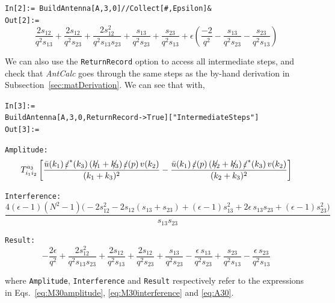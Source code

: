 \begin{mdframed}[backgroundcolor=gray!10, linewidth=0pt]
\texttt{In[2]:= BuildAntenna[A,3,0]//Collect[\#,Epsilon]\&}\\
\hfill
\texttt{Out[2]:=}
    \begin{equation*}
        \frac{2s_{12}}{q^2 s_{13}} + \frac{2s_{12}}{q^2 s_{23}} + \frac{2s_{12}^2}{q^2 s_{13}s_{23}} + \frac{s_{13}}{q^2 s_{23}} + \frac{s_{23}}{q^2 s_{13}} + \epsilon\left(\frac{-2}{q^2} - \frac{s_{13}}{q^2 s_{23}} - \frac{s_{23}}{q^2 s_{13}}\right)
    \end{equation*}
\end{mdframed}

We can also use the \texttt{ReturnRecord} option to access all intermediate steps, and check that 
\textit{AntCalc} goes through the same steps as the by-hand derivation in
Subsection~\ref{sec:matDerivation}. We can see that with,

\begin{mdframed}[backgroundcolor=gray!10, linewidth=0pt]
    \texttt{In[3]:= \\BuildAntenna[A,3,0,ReturnRecord->True]["IntermediateSteps"]}\\
    \texttt{Out[3]:=}

    \texttt{Amplitude:}
    \begin{equation*}
        T^{a_3}_{i_1 i_2}\left[
        \frac{\bar{u}(k_1)\,\slashed{\varepsilon}^*(k_3)\,(\slashed{k_1}+\slashed{k_3})\,\slashed{\varepsilon}(p)\,v(k_2)}{(k_1+k_3)^2}
        -
        \frac{\bar{u}(k_1)\,\slashed{\varepsilon}(p)\,(\slashed{k_2}+\slashed{k_3})\,\slashed{\varepsilon}^*(k_3)\,v(k_2)}{(k_2+k_3)^2}
        \right]
    \end{equation*}

    \texttt{Interference:}
    \begin{equation*}
        \frac{4(\epsilon-1)(N^2-1)\Big(-2s_{12}^2 - 2s_{12}(s_{13}+s_{23}) + (\epsilon-1)s_{13}^2 + 2\epsilon\, s_{13}s_{23} + (\epsilon-1)s_{23}^2\Big)}{s_{13}s_{23}}
    \end{equation*}

    \texttt{Result:}
    \begin{equation*}
        -\frac{2\epsilon}{q^2} + \frac{2s_{12}^2}{q^2 s_{13}s_{23}} + \frac{2s_{12}}{q^2 s_{13}} + \frac{2s_{12}}{q^2 s_{23}} + \frac{s_{13}}{q^2 s_{23}} - \frac{\epsilon\, s_{13}}{q^2 s_{23}} + \frac{s_{23}}{q^2 s_{13}} - \frac{\epsilon\, s_{23}}{q^2 s_{13}}
    \end{equation*}
\end{mdframed}
where \texttt{Amplitude}, \texttt{Interference} and \texttt{Result} respectively refer to the
expressions in Eqs.~\eqref{eq:M30amplitude}, \eqref{eq:M30interference} and \eqref{eq:A30}.


